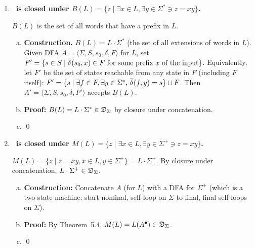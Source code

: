\begin{enumerate}[{5.}1. ]
\begin{enumerate}[(a)]
  \item \textbf{Proof.}  $z\in E(L)$ iff $\exists y\in\Sigma^+\ni yz\in L$ iff there is a state $s$ reachable by processing some $y\in\Sigma^+$ such that $\deltabar{}(s,z)\in F$.  The set of such states $s$ is exactly $S_0'=\bigcup_{\pmb{a}\in\Sigma}\delta(s',\pmb{a})$ for all $s'\in S$.  Hence $L(A')=E(L)$.

  \item $L(A')\in\DSIG$ since $A'$ is an NDFA. \qed
\end{enumerate}

\item \textbf{\DSIG\ is closed under $B(L)=\{z\mid\exists x\in L,\exists y\in\Sigma^*\ni z=xy\}$.}

$B(L)$ is the set of all words that have a prefix in $L$.

\begin{enumerate}[(a)]
  \item \textbf{Construction.}  $B(L)=L\cdot\Sigma^*$ (the set of all extensions of words in $L$).  Given DFA $A=\langle\Sigma,S,s_0,\delta,F\rangle$ for $L$, set $F'=\{s\in S\mid \overline{\delta^{}}(s_0,x)\in F\text{ for some prefix }x\text{ of the input}\}$.  Equivalently, let $F'$ be the set of states reachable from any state in $F$ (including $F$ itself): $F'=\{s\mid\exists f\in F,\exists y\in\Sigma^*,\,\overline{\delta^{}}(f,y)=s\}\cup F$.  Then $A'=\langle\Sigma,S,s_0,\delta,F'\rangle$ accepts $B(L)$.

  \item \textbf{Proof:} $B(L)=L\cdot\Sigma^*\in\mathfrak{D}_\Sigma$ by closure under concatenation.

  \item \qed
\end{enumerate}

\item \textbf{\DSIG\ is closed under $M(L)=\{z\mid\exists x\in L,\exists y\in\Sigma^+\ni z=xy\}$.}

$M(L)=\{z\mid z=xy,x\in L,y\in\Sigma^+\}=L\cdot\Sigma^+$.  By closure under concatenation, $L\cdot\Sigma^+\in\mathfrak{D}_\Sigma$.

\begin{enumerate}[(a)]
  \item \textbf{Construction:} Concatenate $A$ (for $L$) with a DFA for $\Sigma^+$ (which is a two-state machine: start nonfinal, self-loop on $\Sigma$ to final, final self-loops on $\Sigma$).
  \item \textbf{Proof:} By Theorem~5.4, $M(L)=L(A^\bullet)\in\mathfrak{D}_\Sigma$.
  \item \qed
\end{enumerate}


\end{enumerate}
